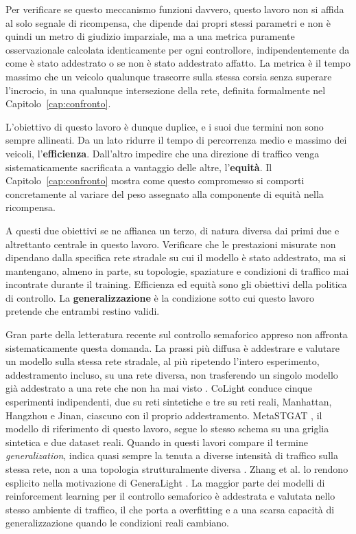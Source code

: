 Per verificare se questo meccanismo funzioni davvero, questo lavoro non
si affida al solo segnale di ricompensa, che dipende dai propri stessi
parametri e non è quindi un metro di giudizio imparziale, ma a una
metrica puramente osservazionale calcolata identicamente per ogni
controllore, indipendentemente da come è stato addestrato o se non è
stato addestrato affatto. La metrica è il tempo massimo che un veicolo
qualunque trascorre sulla stessa corsia senza superare l'incrocio, in una
qualunque intersezione della rete, definita formalmente nel
Capitolo~\ref{cap:confronto}.

L'obiettivo di questo lavoro è dunque duplice, e i suoi due termini non
sono sempre allineati. Da un lato ridurre il tempo di percorrenza medio e
massimo dei veicoli, l'\textbf{efficienza}. Dall'altro impedire che una
direzione di traffico venga sistematicamente sacrificata a vantaggio
delle altre, l'\textbf{equità}. Il Capitolo~\ref{cap:confronto} mostra
come questo compromesso si comporti concretamente al variare del peso
assegnato alla componente di equità nella ricompensa.

A questi due obiettivi se ne affianca un terzo, di natura diversa dai
primi due e altrettanto centrale in questo lavoro. Verificare che le
prestazioni misurate non dipendano dalla specifica rete stradale su cui
il modello è stato addestrato, ma si mantengano, almeno in parte, su
topologie, spaziature e condizioni di traffico mai incontrate durante il
training. Efficienza ed equità sono gli obiettivi della politica di
controllo. La \textbf{generalizzazione} è la condizione sotto cui questo
lavoro pretende che entrambi restino validi.

Gran parte della letteratura recente sul controllo semaforico appreso non
affronta sistematicamente questa domanda. La prassi più diffusa è
addestrare e valutare un modello sulla stessa rete stradale, al più
ripetendo l'intero esperimento, addestramento incluso, su una rete
diversa, non trasferendo un singolo modello già addestrato a una rete che
non ha mai visto \citep{wei2020tscsurvey}. CoLight \citep{wei2019colight}
conduce cinque esperimenti indipendenti, due su reti sintetiche e tre su
reti reali, Manhattan, Hangzhou e Jinan, ciascuno con il proprio
addestramento. MetaSTGAT \citep{wang2022metastgat}, il modello di
riferimento di questo lavoro, segue lo stesso schema su una griglia
sintetica e due dataset reali. Quando in questi lavori compare il termine
\emph{generalization}, indica quasi sempre la tenuta a diverse intensità
di traffico sulla stessa rete, non a una topologia strutturalmente
diversa \citep{wang2026astgcndrl, sun2026tgmaddpg}. Zhang et al. lo
rendono esplicito nella motivazione di GeneraLight
\citep{zhang2020generalight}. La maggior parte dei modelli di
reinforcement learning per il controllo semaforico è addestrata e
valutata nello stesso ambiente di traffico, il che porta a overfitting e
a una scarsa capacità di generalizzazione quando le condizioni reali
cambiano.

